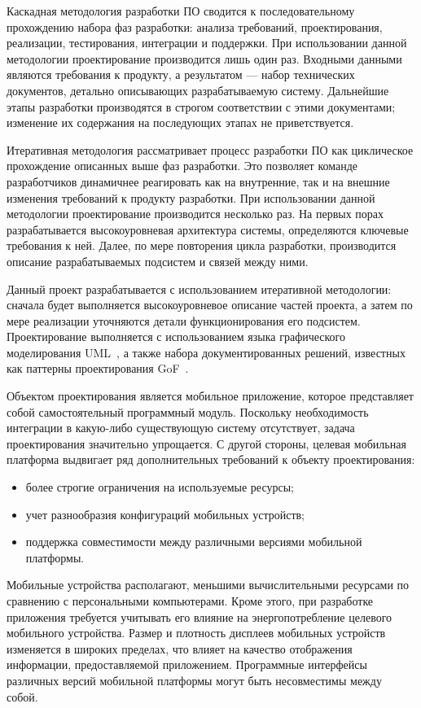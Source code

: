 Каскадная методология разработки ПО сводится к последовательному
прохождению набора фаз разработки:
анализа требований, проектирования, реализации, тестирования, интеграции и поддержки.
При использовании данной методологии проектирование производится
лишь один раз. Входными данными являются требования к продукту,
а результатом --- набор технических документов, детально описывающих
разрабатываемую систему.
Дальнейшие этапы разработки производятся в строгом соответствии с этими документами;
изменение их содержания на последующих этапах не приветствуется.

Итеративная методология рассматривает процесс разработки ПО как
циклическое прохождение описанных выше фаз разработки.
Это позволяет команде разработчиков динамичнее реагировать
как на внутренние, так и на внешние изменения требований к продукту разработки.
При использовании данной методологии проектирование производится несколько раз.
На первых порах разрабатывается высокоуровневая архитектура системы,
определяются ключевые требования к ней. Далее, по мере повторения цикла
разработки, производится описание разрабатываемых подсистем и связей между ними.

Данный проект разрабатывается с использованием итеративной методологии:
сначала будет выполняется высокоуровневое описание частей проекта,
а затем по мере реализации уточняются детали функционирования его подсистем.
Проектирование выполняется с использованием языка графического
моделирования UML~\cite{fowler04}, а также набора документированных решений,
известных как паттерны проектирования GoF~\cite{gamma01}.

Объектом проектирования является мобильное приложение,
которое представляет собой самостоятельный программный модуль.
Поскольку необходимость интеграции в какую-либо существующую
систему отсутствует, задача проектирования значительно упрощается.
С другой стороны, целевая мобильная платформа выдвигает ряд дополнительных
требований к объекту проектирования:
\begin{itemize}
\item более строгие ограничения на используемые ресурсы;
\item учет разнообразия конфигураций мобильных устройств;
\item поддержка совместимости между различными версиями
  мобильной платформы.
\end{itemize}

Мобильные устройства располагают, меньшими вычислительными
ресурсами по сравнению с персональными компьютерами.
Кроме этого, при разработке приложения
требуется учитывать его влияние на энергопотребление
целевого мобильного устройства.
Размер и плотность дисплеев мобильных устройств изменяется в широких пределах,
что влияет на качество отображения информации, предоставляемой приложением.
Программные интерфейсы различных версий мобильной платформы
могут быть несовместимы между собой.

